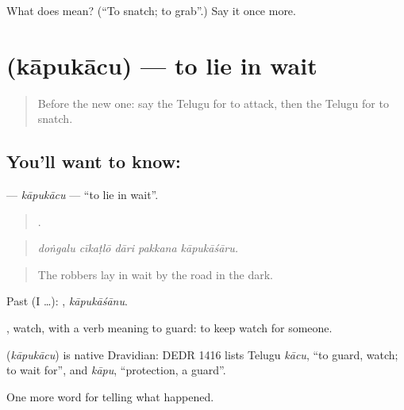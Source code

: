 \begin{tcolorbox}[breakable,colback=teal!4,colframe=teal!35!black,title={Before you move on}]
What does  mean? (\textquotedblleft{}To snatch; to grab\textquotedblright{}.) Say it once more.
\end{tcolorbox}
\section[\texorpdfstring{\te{కాపుకాచు} (kāpukācu)}{కాపుకాచు (kāpukācu)}]{ (kāpukācu) — to lie in wait}

\label{lesson:TE-C348-kapukacu}



\begin{quote}
Before the new one: say the Telugu for to attack, then the Telugu for to snatch.
\end{quote}

\subsection*{You'll want to know: }
\textbf{} — \emph{kāpukācu} — \textquotedblleft{}to lie in wait\textquotedblright{}.

\begin{quote}
    .
\end{quote}

\begin{quote}
\emph{doṅgalu cīkaṭlō dāri pakkana kāpukāśāru.}
\end{quote}

\begin{quote}
The robbers lay in wait by the road in the dark.
\end{quote}

Past (I …): , \emph{kāpukāśānu}.

, watch, with a verb meaning to guard: to keep watch for someone.

\begin{cousinweb}
\textbf{} (\emph{kāpukācu}) is native Dravidian: DEDR 1416 lists Telugu \emph{kācu}, \textquotedblleft{}to guard, watch; to wait for\textquotedblright{}, and \emph{kāpu}, \textquotedblleft{}protection, a guard\textquotedblright{}.
\end{cousinweb}

\begin{grammarlens}[title={What you've built}]
One more word for telling what happened.
\end{grammarlens}

